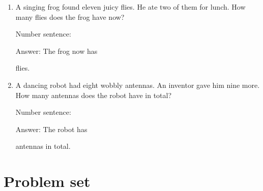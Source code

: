 \documentclass{tufte-book}
\begin{document}
\begin{enumerate}
\item
  A singing frog found eleven juicy flies. He ate two of them for lunch.
  How many flies does the frog have now?\medskip\par
  Number sentence:
  \dotfill\medskip\par
  Answer: The frog now has
  \dotfill\medskip\par\mbox{}\dotfill\medskip\par\mbox{}\dotfill\bigskip
  flies.
\item
  A dancing robot had eight wobbly antennas. An inventor gave him nine
  more. How many antennas does the robot have in total?\medskip\par
  Number sentence:
  \dotfill\medskip\par
  Answer: The robot has
  \dotfill\medskip\par\mbox{}\dotfill\medskip\par\mbox{}\dotfill\bigskip
  antennas in total.
\end{enumerate}



\clearpage\section{Problem set }
\end{document}
